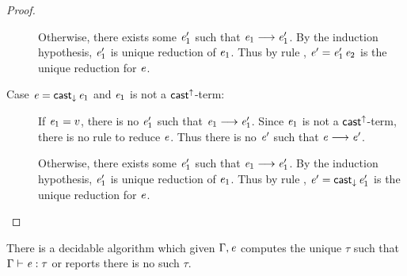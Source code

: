 \begin{proof}
\begin{description}
		Otherwise, there exists some $\mathit{e'_{{\mathrm{1}}}}$ such that $\mathit{e_{{\mathrm{1}}}}  \longrightarrow  \mathit{e'_{{\mathrm{1}}}}$. By the induction hypothesis, $\mathit{e'_{{\mathrm{1}}}}$ is unique reduction of $\mathit{e_{{\mathrm{1}}}}$. Thus by rule , $\mathit{e}'=\mathit{e'_{{\mathrm{1}}}} \, \mathit{e_{{\mathrm{2}}}}$ is the unique reduction for $\mathit{e}$.
		\item[Case $\mathit{e}=\mathsf{cast}_{\downarrow} \, \mathit{e_{{\mathrm{1}}}}$ and $\mathit{e_{{\mathrm{1}}}}$ is not a $ \mathsf{cast}^{\uparrow} $-term:] If $\mathit{e_{{\mathrm{1}}}}=v$, there is no $\mathit{e'_{{\mathrm{1}}}}$ such that $\mathit{e_{{\mathrm{1}}}}  \longrightarrow  \mathit{e'_{{\mathrm{1}}}}$. Since $\mathit{e_{{\mathrm{1}}}}$ is not a $ \mathsf{cast}^{\uparrow} $-term, there is no rule to reduce $\mathit{e}$. Thus there is no $\mathit{e}'$ such that $\mathit{e}  \longrightarrow  \mathit{e'}$.
		
		Otherwise, there exists some $\mathit{e'_{{\mathrm{1}}}}$ such that $\mathit{e_{{\mathrm{1}}}}  \longrightarrow  \mathit{e'_{{\mathrm{1}}}}$. By the induction hypothesis, $\mathit{e'_{{\mathrm{1}}}}$ is unique reduction of $\mathit{e_{{\mathrm{1}}}}$. Thus by rule , $\mathit{e}'=\mathsf{cast}_{\downarrow} \, \mathit{e'_{{\mathrm{1}}}}$ is the unique reduction for $\mathit{e}$.
	\end{description}
\end{proof}

\begin{lem}
	There is a decidable algorithm which given $\Gamma, \mathit{e}$ computes the unique $\tau$ such that $\Gamma  \vdash  \mathit{e}  :  \tau$ or reports there is no such $\tau$.
\end{lem}

